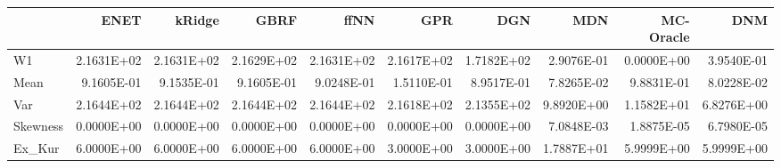 \begin{tabular}{lrrrrrrrrr}
\toprule
{} &       ENET &     kRidge &       GBRF &       ffNN &        GPR &        DGN &        MDN &  MC-Oracle &        DNM \\
\midrule
W1       & 2.1631E+02 & 2.1631E+02 & 2.1629E+02 & 2.1631E+02 & 2.1617E+02 & 1.7182E+02 & 2.9076E-01 & 0.0000E+00 & 3.9540E-01 \\
Mean     & 9.1605E-01 & 9.1535E-01 & 9.1605E-01 & 9.0248E-01 & 1.5110E-01 & 8.9517E-01 & 7.8265E-02 & 9.8831E-01 & 8.0228E-02 \\
Var      & 2.1644E+02 & 2.1644E+02 & 2.1644E+02 & 2.1644E+02 & 2.1618E+02 & 2.1355E+02 & 9.8920E+00 & 1.1582E+01 & 6.8276E+00 \\
Skewness & 0.0000E+00 & 0.0000E+00 & 0.0000E+00 & 0.0000E+00 & 0.0000E+00 & 0.0000E+00 & 7.0848E-03 & 1.8875E-05 & 6.7980E-05 \\
Ex\_Kur   & 6.0000E+00 & 6.0000E+00 & 6.0000E+00 & 6.0000E+00 & 3.0000E+00 & 3.0000E+00 & 1.7887E+01 & 5.9999E+00 & 5.9999E+00 \\
\bottomrule
\end{tabular}

